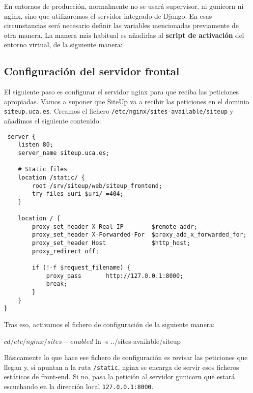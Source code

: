 En entornos de producción, normalmente no se usará supervisor, ni gunicorn ni
nginx, sino que utilizaremos el servidor integrado de Django. En esas
circunstancias será necesario definir las variables mencionadas previamente de
otra manera. La manera más habitual es añadirlas al \textbf{script de activación} del
entorno virtual, de la siguiente manera:


\subsection{Configuración del servidor frontal}

El siguiente paso es configurar el servidor nginx para que reciba las peticiones
apropiadas. Vamos a suponer que SiteUp va a recibir las peticiones en el dominio
\texttt{siteup.uca.es}. Creamos el fichero
\texttt{/etc/nginx/sites-available/siteup} y añadimos el siguiente contenido:

\begin{verbatim}
 server {
    listen 80;
    server_name siteup.uca.es;

    # Static files
    location /static/ {
        root /srv/siteup/web/siteup_frontend;
        try_files $uri $uri/ =404;
    }

    location / {
        proxy_set_header X-Real-IP        $remote_addr;
        proxy_set_header X-Forwarded-For  $proxy_add_x_forwarded_for;
        proxy_set_header Host             $http_host;
        proxy_redirect off;

        if (!-f $request_filename) {
            proxy_pass       http://127.0.0.1:8000;
            break;
        }
    }
} 
\end{verbatim}

Tras eso, activamos el fichero de configuración de la siguiente manera:

\begin{bashcode}
$ cd /etc/nginx/sites-enabled
$ ln -s ../sites-available/siteup
\end{bashcode}

Básicamente lo que hace ese fichero de configuración es revisar las peticiones
que llegan y, si apuntan a la ruta \texttt{/static}, nginx se encarga de servir
esos ficheros estáticos de front-end. Si no, pasa la petición al servidor
gunicorn que estará escuchando en la dirección local \texttt{127.0.0.1:8000}.

